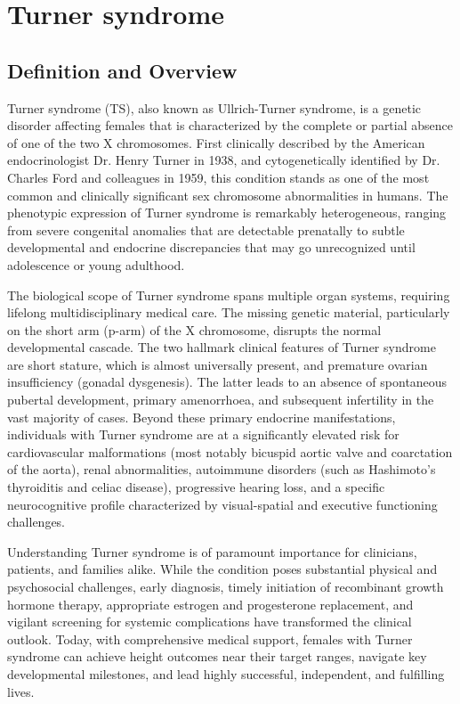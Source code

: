 \chapter{Turner syndrome}

\section*{Definition and Overview}
Turner syndrome (TS), also known as Ullrich-Turner syndrome, is a genetic disorder affecting females that is characterized by the complete or partial absence of one of the two X chromosomes. First clinically described by the American endocrinologist Dr. Henry Turner in 1938, and cytogenetically identified by Dr. Charles Ford and colleagues in 1959, this condition stands as one of the most common and clinically significant sex chromosome abnormalities in humans. The phenotypic expression of Turner syndrome is remarkably heterogeneous, ranging from severe congenital anomalies that are detectable prenatally to subtle developmental and endocrine discrepancies that may go unrecognized until adolescence or young adulthood.

The biological scope of Turner syndrome spans multiple organ systems, requiring lifelong multidisciplinary medical care. The missing genetic material, particularly on the short arm (p-arm) of the X chromosome, disrupts the normal developmental cascade. The two hallmark clinical features of Turner syndrome are short stature, which is almost universally present, and premature ovarian insufficiency (gonadal dysgenesis). The latter leads to an absence of spontaneous pubertal development, primary amenorrhoea, and subsequent infertility in the vast majority of cases. Beyond these primary endocrine manifestations, individuals with Turner syndrome are at a significantly elevated risk for cardiovascular malformations (most notably bicuspid aortic valve and coarctation of the aorta), renal abnormalities, autoimmune disorders (such as Hashimoto's thyroiditis and celiac disease), progressive hearing loss, and a specific neurocognitive profile characterized by visual-spatial and executive functioning challenges.

Understanding Turner syndrome is of paramount importance for clinicians, patients, and families alike. While the condition poses substantial physical and psychosocial challenges, early diagnosis, timely initiation of recombinant growth hormone therapy, appropriate estrogen and progesterone replacement, and vigilant screening for systemic complications have transformed the clinical outlook. Today, with comprehensive medical support, females with Turner syndrome can achieve height outcomes near their target ranges, navigate key developmental milestones, and lead highly successful, independent, and fulfilling lives.

